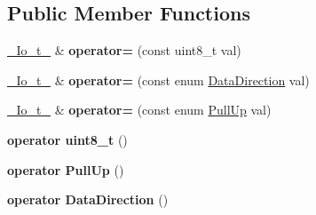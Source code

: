 \subsection*{Public Member Functions}
\begin{DoxyCompactItemize}
\item 
\hyperlink{structports_1_1__Io}{\+\_\+\+Io\+\_\+t\+\_\+} \& {\bfseries operator=} (const uint8\+\_\+t val)\hypertarget{structports_1_1__Io_aa63b64d1b91b6b4aad47aed873fe3c32}{}\label{structports_1_1__Io_aa63b64d1b91b6b4aad47aed873fe3c32}

\item 
\hyperlink{structports_1_1__Io}{\+\_\+\+Io\+\_\+t\+\_\+} \& {\bfseries operator=} (const enum \hyperlink{namespaceports_a46987e78fa447129742fadda5eccafb4}{Data\+Direction} val)\hypertarget{structports_1_1__Io_ab145f95fb959830980100fbc45ac69af}{}\label{structports_1_1__Io_ab145f95fb959830980100fbc45ac69af}

\item 
\hyperlink{structports_1_1__Io}{\+\_\+\+Io\+\_\+t\+\_\+} \& {\bfseries operator=} (const enum \hyperlink{namespaceports_a49bf0ccedb4cfed89a328574e53bec07}{Pull\+Up} val)\hypertarget{structports_1_1__Io_ae7f2ce69c05d6ea05eb199b12024ec97}{}\label{structports_1_1__Io_ae7f2ce69c05d6ea05eb199b12024ec97}

\item 
{\bfseries operator uint8\+\_\+t} ()\hypertarget{structports_1_1__Io_a0d29b542e05f091d192777422f3f533d}{}\label{structports_1_1__Io_a0d29b542e05f091d192777422f3f533d}

\item 
{\bfseries operator Pull\+Up} ()\hypertarget{structports_1_1__Io_a2839cbabc2755394ea5c75f82fa01757}{}\label{structports_1_1__Io_a2839cbabc2755394ea5c75f82fa01757}

\item 
{\bfseries operator Data\+Direction} ()\hypertarget{structports_1_1__Io_a762e4da314442a065391daee5b738d25}{}\label{structports_1_1__Io_a762e4da314442a065391daee5b738d25}

\end{DoxyCompactItemize}

